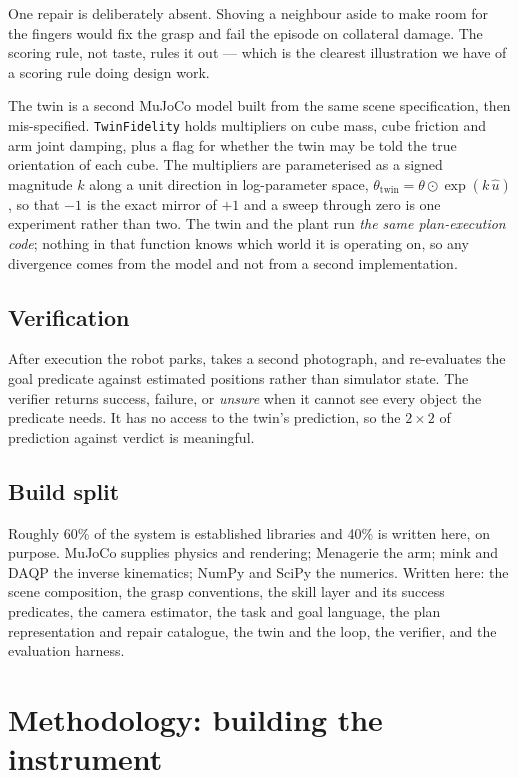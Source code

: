 \documentclass[11pt,a4paper]{article}
\begin{document}
One repair is deliberately absent. Shoving a neighbour aside to make room for the
fingers would fix the grasp and fail the episode on collateral damage. The
scoring rule, not taste, rules it out --- which is the clearest illustration we
have of a scoring rule doing design work.

The twin is a second MuJoCo model built from the same scene specification, then
mis-specified. \texttt{TwinFidelity} holds multipliers on cube mass, cube
friction and arm joint damping, plus a flag for whether the twin may be told the
true orientation of each cube. The multipliers are parameterised as a signed
magnitude $k$ along a unit direction in log-parameter space,
$\theta_{\text{twin}} = \theta \odot \exp(k\,\hat{u})$, so that $-1$ is the exact
mirror of $+1$ and a sweep through zero is one experiment rather than two. The
twin and the plant run \emph{the same plan-execution code}; nothing in that
function knows which world it is operating on, so any divergence comes from the
model and not from a second implementation.

\subsection{Verification}
After execution the robot parks, takes a second photograph, and re-evaluates the
goal predicate against estimated positions rather than simulator state. The
verifier returns success, failure, or \emph{unsure} when it cannot see every
object the predicate needs. It has no access to the twin's prediction, so the
$2\times2$ of prediction against verdict is meaningful.

\subsection{Build split}
Roughly 60\% of the system is established libraries and 40\% is written here, on
purpose. MuJoCo supplies physics and rendering; Menagerie the arm; mink and DAQP
the inverse kinematics; NumPy and SciPy the numerics. Written here: the scene
composition, the grasp conventions, the skill layer and its success predicates,
the camera estimator, the task and goal language, the plan representation and
repair catalogue, the twin and the loop, the verifier, and the evaluation
harness.

\section{Methodology: building the instrument}
\label{sec:method}
\end{document}
